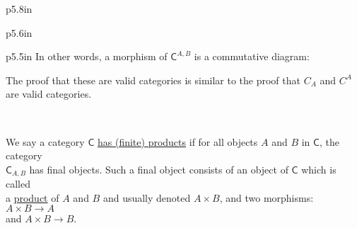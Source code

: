 \documentclass{book}
\newcommand{\hFour}{%
   \color{Cerulean}
   \fontsize{12}{14}\selectfont%
}
\newenvironment{myIndent}{%
   \begin{adjustwidth}{2.5em}{0em}%
}{%
   \end{adjustwidth}%
}
\newenvironment{myTindent}{%
   \begin{adjustwidth}{7.5em}{0em}%
}{%
   \end{adjustwidth}%
}
\newcommand{\udefine}[1]{{%
   \setulcolor{Red}%
   \setul{0.14em}{0.07em}%
   \ul{#1}%
}}
\newcommand{\mcateg}[1]{{\bm{\mathsf{#1}}}}
\newcommand{\retTwo}{\hfill\bigbreak}
\begin{document}
\begin{myIndent}
{\begin{tabular}{ p{5.8in} }
\begin{tabular}{ p{5.6in}}
\begin{tabular}{ p{5.5in}}
            In other words, a morphism of $\mcateg{C}^{A,B}$ is a commutative diagram:

            {\center
            \par}
         \end{tabular}
         
         {\begin{myTindent} \hFour
            The proof that these are valid categories is similar to the proof that $C_A$ and $C^A$ are valid categories.
         \end{myTindent}}
      \end{tabular}

      \\ \hline
   \end{tabular}}
\end{myIndent}

\retTwo

We say a category $\mcateg{C}$ \udefine{has (finite) products} if for all objects $A$ and $B$ in $\mcateg{C}$, the category\\ $\mcateg{C}_{A,B}$ has final objects. Such a final object consists of an object of $\mcateg{C}$ which is called\\ a \udefine{product} of $A$ and $B$ and usually denoted $A \times B$, and two morphisms: $A \times B \longrightarrow A$\\ and $A \times B \longrightarrow B$.
\end{document}

